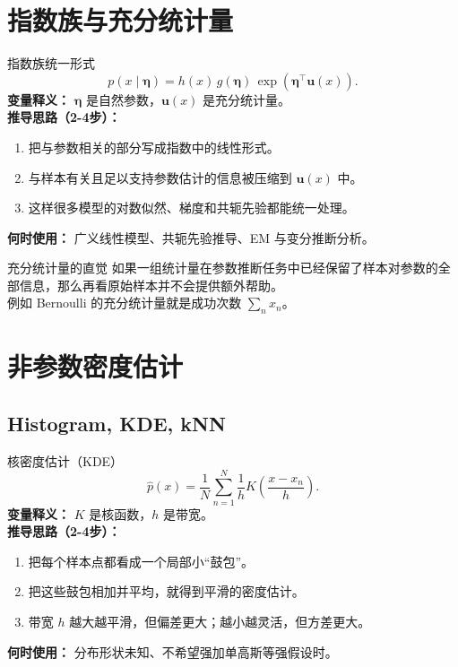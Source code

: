 \documentclass[11pt]{article}
\begin{document}
\section{指数族与充分统计量}
\begin{formulabox}{指数族统一形式}
\begin{equation}
p(x\mid \boldsymbol{\eta})
= h(x)\,g(\boldsymbol{\eta})\,
\exp\left(\boldsymbol{\eta}^\top \mathbf{u}(x)\right).
\end{equation}
\textbf{变量释义：} $\boldsymbol{\eta}$ 是自然参数，$\mathbf{u}(x)$ 是充分统计量。\\
\textbf{推导思路（2-4步）：}
\begin{enumerate}[leftmargin=1.6em]
  \item 把与参数相关的部分写成指数中的线性形式。
  \item 与样本有关且足以支持参数估计的信息被压缩到 $\mathbf{u}(x)$ 中。
  \item 这样很多模型的对数似然、梯度和共轭先验都能统一处理。
\end{enumerate}
\textbf{何时使用：} 广义线性模型、共轭先验推导、EM 与变分推断分析。
\end{formulabox}

\begin{insightbox}{充分统计量的直觉}
如果一组统计量在参数推断任务中已经保留了样本对参数的全部信息，那么再看原始样本并不会提供额外帮助。\\
例如 Bernoulli 的充分统计量就是成功次数 $\sum_n x_n$。
\end{insightbox}

\section{非参数密度估计}
\subsection{Histogram, KDE, kNN}
\begin{formulabox}{核密度估计（KDE）}
\begin{equation}
\hat{p}(x)=\frac{1}{N}\sum_{n=1}^{N}\frac{1}{h}
K\left(\frac{x-x_n}{h}\right).
\end{equation}
\textbf{变量释义：} $K$ 是核函数，$h$ 是带宽。\\
\textbf{推导思路（2-4步）：}
\begin{enumerate}[leftmargin=1.6em]
  \item 把每个样本点都看成一个局部小“鼓包”。
  \item 把这些鼓包相加并平均，就得到平滑的密度估计。
  \item 带宽 $h$ 越大越平滑，但偏差更大；越小越灵活，但方差更大。
\end{enumerate}
\textbf{何时使用：} 分布形状未知、不希望强加单高斯等强假设时。
\end{formulabox}
\end{document}
